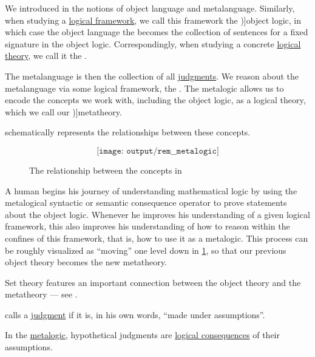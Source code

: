 \begin{concept}\label{con:metalogic}
  We introduced in  the notions of object language and metalanguage. Similarly, when studying a \hyperref[def:logical_framework]{logical framework}, we call this framework the \term[en=object logic (\cite[3]{Kleene2002Logic})]{object logic}, in which case the object language the becomes the collection of sentences for a fixed signature in the object logic. Correspondingly, when studying a concrete \hyperref[def:logical_theory]{logical theory}, we call it the .

  The metalanguage is then the collection of all \hyperref[con:judgment]{judgments}. We reason about the metalanguage via some logical framework, the . The metalogic allows us to encode the concepts we work with, including the object logic, as a logical theory, which we call our \term[en=metatheory (\cite[199]{Kleene2002Logic})]{metatheory}.

   schematically represents the relationships between these concepts.

  \begin{figure}[!ht]
    \begin{equation*}
      \texttt{[image: output/rem\_\_metalogic]}
    \end{equation*}
    \caption{The relationship between the concepts in }\label{fig:con:metalogic}
  \end{figure}

  A human begins his journey of understanding mathematical logic by using the metalogical syntactic or semantic consequence operator to prove statements about the object logic. Whenever he improves his understanding of a given logical framework, this also improves his understanding of how to reason within the confines of this framework, that is, how to use it as a metalogic. This process can be roughly visualized as \enquote{moving} one level down in \cref{fig:con:metalogic}, so that our previous object theory becomes the new metatheory.
\end{concept}
\begin{comments}
  \item Set theory features an important connection between the object theory and the metatheory --- see .
\end{comments}

\begin{concept}\label{con:hypothetical_judgment}
   calls a \hyperref[con:judgment]{judgment}  if it is, in his own words, \enquote{made under assumptions}.
\end{concept}
\begin{comments}
  \item In the \hyperref[con:metalogic]{metalogic}, hypothetical judgments are \hyperref[def:consequence_relation]{logical consequences} of their assumptions.
\end{comments}

